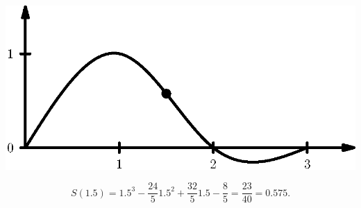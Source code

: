 \documentclass[12pt]{article}                   %
\begin{document}
\begin{priklad}[5.1]
\begin{reseni}
{	}
		\begin{center}
			\includegraphics{spline.eps}
		\end{center}

		$$ S(1.5) = 1.5^3 - \frac{24}{5}1.5^2 + \frac{32}{5}1.5 - \frac{8}{5} = \frac{23}{40} = 0.575. $$
	\end{reseni}
\end{priklad}
\end{document}
